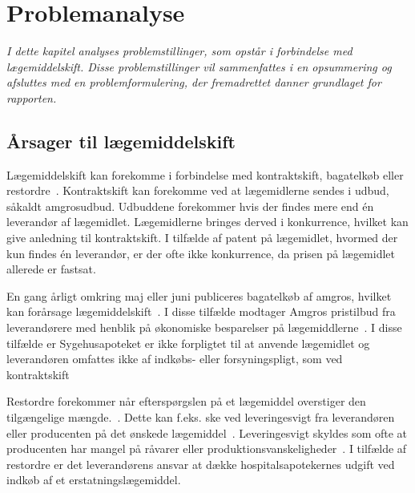 \chapter{Problemanalyse}
\textit{I dette kapitel analyses problemstillinger, som opstår i forbindelse med lægemiddelskift. Disse problemstillinger vil sammenfattes i en opsummering og afsluttes med en problemformulering, der fremadrettet danner  grundlaget for rapporten.}

\section{Årsager til lægemiddelskift}
Lægemiddelskift kan forekomme i forbindelse med kontraktskift, bagatelkøb eller restordre~\citep{Amgros2015}. Kontraktskift kan forekomme ved at lægemidlerne sendes i udbud, såkaldt amgrosudbud. Udbuddene forekommer hvis der findes mere end én leverandør af lægemidlet. Lægemidlerne bringes derved i konkurrence, hvilket kan give anledning til kontraktskift. I tilfælde af patent på lægemidlet, hvormed der kun findes én leverandør, er der ofte ikke konkurrence, da prisen på lægemidlet allerede er fastsat.~\citep{Amgros2015} 

En gang årligt omkring maj eller juni publiceres bagatelkøb af amgros, hvilket kan forårsage lægemiddelskift~\citep{Amgros2018}. I disse tilfælde modtager Amgros pristilbud fra leverandørere med henblik på økonomiske besparelser på lægemiddlerne~\citep{Amgros2012}. I disse tilfælde er Sygehusapoteket er ikke forpligtet til at anvende lægemidlet og leverandøren omfattes ikke af indkøbs- eller forsyningspligt, som ved kontraktskift~\citep{Amgros2018}

Restordre forekommer når efterspørgslen på et lægemiddel overstiger den tilgængelige mængde.~\citep{Amgros2015}. Dette kan f.eks. ske ved leveringesvigt fra leverandøren eller producenten på det ønskede lægemiddel~\citep{Amgros2017, Laegemiddelinformaion2017}. Leveringesvigt skyldes som ofte at producenten har mangel på råvarer eller produktionsvanskeligheder~\citep{Amgros2017, Laegemiddelinformaion2017}. I tilfælde  af restordre er det leverandørens ansvar at dække hospitalsapotekernes udgift ved indkøb af et erstatningslægemiddel. 

 

